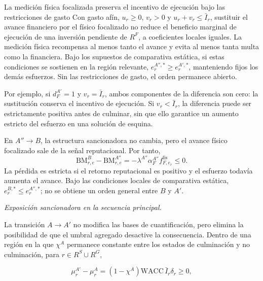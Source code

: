 \begin{resultadobox}
{La medición física focalizada preserva el incentivo de ejecución bajo las restricciones de gasto}
\label{res:ejecucion_rf_condicional}
Con gasto afín, \(u_r\geq0\), \(v_r>0\) y \(u_r+v_r\leq\bar I_r\), sustituir el avance financiero por el físico focalizado no reduce el beneficio marginal de ejecución de una inversión pendiente de \(R^F\), a coeficientes locales iguales. La medición física recompensa al menos tanto el avance y evita al menos tanta multa como la financiera. Bajo los supuestos de comparativa estática, si estas condiciones se sostienen en la región relevante, \(e_r^{A'',*}\geq e_r^{A',*}\), manteniendo fijos los demás esfuerzos. Sin las restricciones de gasto, el orden permanece abierto.
\end{resultadobox}

Por ejemplo, si \(d_F^{A'}=1\) y \(v_r=\bar I_r\), ambos componentes de la diferencia son cero: la sustitución conserva el incentivo de ejecución. Si \(v_r<\bar I_r\), la diferencia puede ser estrictamente positiva antes de culminar, sin que ello garantice un aumento estricto del esfuerzo en una solución de esquina.

En \(A''\to B\), la estructura sancionadora no cambia, pero el avance físico focalizado sale de la señal reputacional. Por tanto,
\begin{equation}
\label{eq:diferencia_ejecucion_app_b_rf}
\mathrm{BM}_{r,e}^{B}-\mathrm{BM}_{r,e}^{A''}
=-\lambda^{A''}\alpha_F^{A''}f_{F,e_r}^{\mathrm{fis}}\leq0.
\end{equation}
La pérdida es estricta si el retorno reputacional es positivo y el esfuerzo todavía aumenta el avance. Bajo las condiciones locales de comparativa estática, \(e_r^{B,*}\leq e_r^{A'',*}\); no se obtiene un orden general entre \(B\) y \(A'\).

\medskip
\noindent\textit{Exposición sancionadora en la secuencia principal.}

La transición \(A\to A'\) no modifica las bases de cuantificación, pero elimina la posibilidad de que el umbral agregado desactive la consecuencia. Dentro de una región en la que \(\chi^A\) permanece constante entre los estados de culminación y no culminación, para \(r\in R^{S}\cup R^{G}\),

\begin{equation}
\label{eq:diferencia_exposicion_a_ap}
\mu_r^{A'}
-
\mu_r^{A}
=
(1-\chi^A)
\mathrm{WACC}\,
\bar I_r
\delta_r
\geq
0,
\end{equation}

